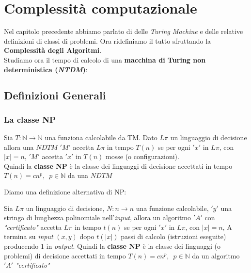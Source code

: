 \chapter{Complessità computazionale}
Nel capitolo precedente abbiamo parlato di delle \textit{Turing Machine} e delle relative definizioni di classi di problemi. Ora ridefiniamo il tutto sfruttando la \textbf{Complessità degli Algoritmi}.\\
Studiamo ora il tempo di calcolo di una \textbf{macchina di Turing non
	deterministica (\textit{NTDM})}:
\section{Definizioni Generali}
\subsection{La classe NP}
\begin{definizione}
	Sia $T:\mathbb{N}\to\mathbb{N}$ una funziona calcolabile da TM. Dato $L\pi$ un
	linguaggio di decisione allora una $NDTM$ $ 'M' $ accetta $L\pi$ in tempo
	$T(n)$ se per ogni $ 'x' $ in $L\pi$, con $|x|=n$,  $ 'M' $ accetta $ 'x' $ in $T(n)$
	mosse (o configurazioni).\\
	Quindi la \textbf{classe NP} è la classe dei linguaggi di decisione accettati
	in tempo $T(n)=cn^p,\,\,\,p\in \mathbb{N}$ da una $NDTM$
\end{definizione}
Diamo una definizione alternativa di NP:
\begin{definizione}
	Sia $L\pi$ un linguaggio di decisione, $N:n\to n$ una funzione calcolabile,
	$ 'y' $ una stringa di lunghezza polinomiale nell'\textit{input}, allora un algoritmo $ 'A' $
	con \textit{"certificato"} accetta $L\pi$ in tempo $t(n)$ se per ogni $ 'x' $ in $L\pi$,
	con $|x|=n$, A termina su \textit{input} $(x,y)$ dopo $t(|x|)$ passi di calcolo
	(istruzioni eseguite) producendo 1 in \textit{output}.
	Quindi la \textbf{classe NP} è la classe dei linguaggi (o problemi) di
	decisione accettati in tempo $T(n)=cn^p,\,\,\,p\in\mathbb{N}$ da un algoritmo
	$ 'A' $ \textit{"certificato"}
\end{definizione}
